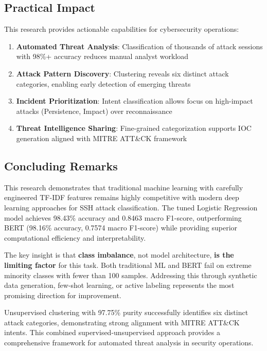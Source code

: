\documentclass[acmlarge,screen,nonacm]{acmart}
\begin{document}
\subsection{Practical Impact}

This research provides actionable capabilities for cybersecurity operations:

\begin{enumerate}
    \item \textbf{Automated Threat Analysis}: Classification of thousands of attack sessions with 98\%+ accuracy reduces manual analyst workload
    
    \item \textbf{Attack Pattern Discovery}: Clustering reveals six distinct attack categories, enabling early detection of emerging threats
    
    \item \textbf{Incident Prioritization}: Intent classification allows focus on high-impact attacks (Persistence, Impact) over reconnaissance
    
    \item \textbf{Threat Intelligence Sharing}: Fine-grained categorization supports IOC generation aligned with MITRE ATT\&CK framework
\end{enumerate}

\subsection{Concluding Remarks}

This research demonstrates that traditional machine learning with carefully engineered TF-IDF features remains highly competitive with modern deep learning approaches for SSH attack classification. The tuned Logistic Regression model achieves 98.43\% accuracy and 0.8463 macro F1-score, outperforming BERT (98.16\% accuracy, 0.7574 macro F1-score) while providing superior computational efficiency and interpretability.

The key insight is that \textbf{class imbalance}, not model architecture, \textbf{ is the limiting factor} for this task. Both traditional ML and BERT fail on extreme minority classes with fewer than 100 samples. Addressing this through synthetic data generation, few-shot learning, or active labeling represents the most promising direction for improvement.

Unsupervised clustering with 97.75\% purity successfully identifies six distinct attack categories, demonstrating strong alignment with MITRE ATT\&CK intents. This combined supervised-unsupervised approach provides a comprehensive framework for automated threat analysis in security operations.
\end{document}
